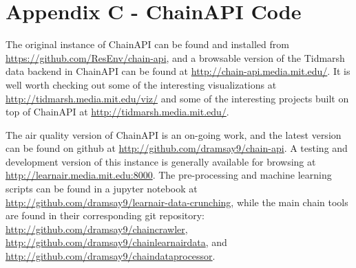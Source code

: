 \chapter{Appendix C - ChainAPI Code}

The original instance of ChainAPI can be found and installed from \url{https://github.com/ResEnv/chain-api}, and a browsable version of the Tidmarsh data backend in ChainAPI can be found at \url{http://chain-api.media.mit.edu/}.  It is well worth checking out some of the interesting visualizations at \url{http://tidmarsh.media.mit.edu/viz/} and some of the interesting projects built on top of ChainAPI at \url{http://tidmarsh.media.mit.edu/}.

The air quality version of ChainAPI is an on-going work, and the latest version can be found on github at \url{http://github.com/dramsay9/chain-api}.  A testing and development version of this instance is generally available for browsing at \url{http://learnair.media.mit.edu:8000}. The pre-processing and machine learning scripts can be found in a jupyter notebook at \url{http://github.com/dramsay9/learnair-data-crunching}, while the main chain tools are found in their corresponding git repository: \url{http://github.com/dramsay9/chaincrawler}, \url{http://github.com/dramsay9/chainlearnairdata}, and \url{http://github.com/dramsay9/chaindataprocessor}.

\clearpage
\newpage

